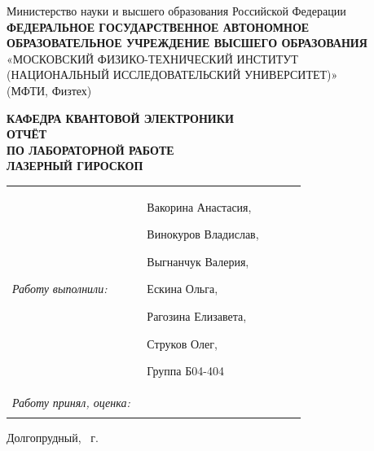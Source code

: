 \documentclass[12pt, a4paper]{article}
\begin{document}

\begin{titlepage}
\thispagestyle{empty}

\begin{center}
\small
Министерство науки и высшего образования Российской Федерации\\[2mm]
\textbf{ФЕДЕРАЛЬНОЕ ГОСУДАРСТВЕННОЕ АВТОНОМНОЕ
ОБРАЗОВАТЕЛЬНОЕ УЧРЕЖДЕНИЕ ВЫСШЕГО ОБРАЗОВАНИЯ}\\[1mm]
«МОСКОВСКИЙ ФИЗИКО-ТЕХНИЧЕСКИЙ ИНСТИТУТ\\
(НАЦИОНАЛЬНЫЙ ИССЛЕДОВАТЕЛЬСКИЙ УНИВЕРСИТЕТ)»\\
(МФТИ, Физтех)
\end{center}

\vspace{18mm}

\begin{center}
\large \textbf{КАФЕДРА КВАНТОВОЙ ЭЛЕКТРОНИКИ}\\[10mm]
\Large \textbf{ОТЧЁТ}\\[2mm]
\large \textbf{ПО ЛАБОРАТОРНОЙ РАБОТЕ}\\[14mm]
\Large \textbf{ЛАЗЕРНЫЙ ГИРОСКОП}
\end{center}

\vfill

\noindent
\begin{tabular}{@{}p{0.44\linewidth}p{0.52\linewidth}@{}}
\textit{Работу выполнили:} & Вакорина Анастасия,

Винокуров Владислав,

Выгнанчук Валерия,

Ескина Ольга,

Рагозина Елизавета,

Струков Олег,

Группа Б04-404 \\[8mm]

\textit{Работу принял, оценка:} & \\[3mm]
 \\
\end{tabular}


\vspace{12mm}

\begin{center}
\small Долгопрудный, \the\year{}~г.
\end{center}

\end{titlepage}
\end{document}
